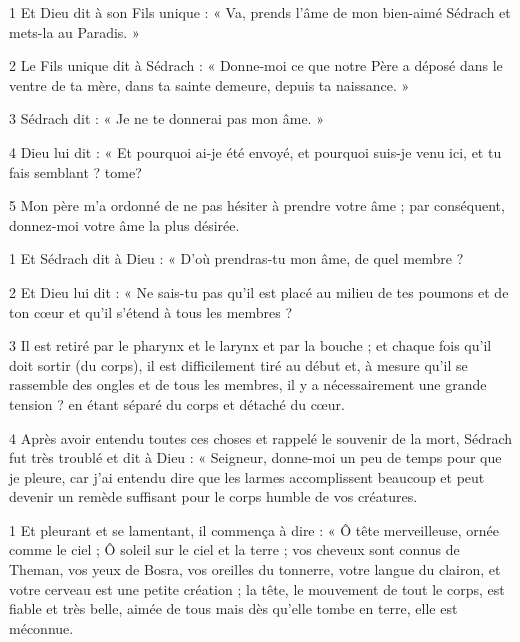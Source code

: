 
\par 1 Et Dieu dit à son Fils unique : « Va, prends l'âme de mon bien-aimé Sédrach et mets-la au Paradis. »

\par 2 Le Fils unique dit à Sédrach : « Donne-moi ce que notre Père a déposé dans le ventre de ta mère, dans ta sainte demeure, depuis ta naissance. »

\par 3 Sédrach dit : « Je ne te donnerai pas mon âme. »

\par 4 Dieu lui dit : « Et pourquoi ai-je été envoyé, et pourquoi suis-je venu ici, et tu fais semblant ? tome?

\par 5 Mon père m'a ordonné de ne pas hésiter à prendre votre âme ; par conséquent, donnez-moi votre âme la plus désirée.


\par 1 Et Sédrach dit à Dieu : « D'où prendras-tu mon âme, de quel membre ?

\par 2 Et Dieu lui dit : « Ne sais-tu pas qu'il est placé au milieu de tes poumons et de ton cœur et qu'il s'étend à tous les membres ?

\par 3 Il est retiré par le pharynx et le larynx et par la bouche ; et chaque fois qu'il doit sortir (du corps), il est difficilement tiré au début et, à mesure qu'il se rassemble des ongles et de tous les membres, il y a nécessairement une grande tension ? en étant séparé du corps et détaché du cœur.

\par 4 Après avoir entendu toutes ces choses et rappelé le souvenir de la mort, Sédrach fut très troublé et dit à Dieu : « Seigneur, donne-moi un peu de temps pour que je pleure, car j'ai entendu dire que les larmes accomplissent beaucoup et peut devenir un remède suffisant pour le corps humble de vos créatures.



\par 1 Et pleurant et se lamentant, il commença à dire : « Ô tête merveilleuse, ornée comme le ciel ; Ô soleil sur le ciel et la terre ; vos cheveux sont connus de Theman, vos yeux de Bosra, vos oreilles du tonnerre, votre langue du clairon, et votre cerveau est une petite création ; la tête, le mouvement de tout le corps, est fiable et très belle, aimée de tous mais dès qu'elle tombe en terre, elle est méconnue.

